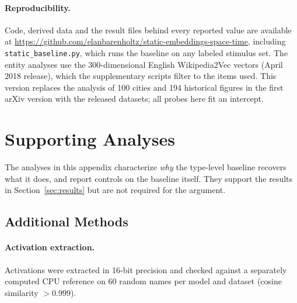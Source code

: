 \documentclass[11pt]{article}
\newif\ifanon
\begin{document}
\paragraph{Reproducibility.}
Code, derived data and the result files behind every reported value are available
\ifanon in the supplementary material\else at \url{https://github.com/elanbarenholtz/static-embeddings-space-time}\fi,
including \texttt{static\_baseline.py}, which runs the baseline
on any labeled stimulus set. The entity analyses use the 300-dimensional English Wikipedia2Vec vectors (April 2018 release), which the supplementary scripts filter to the items used.\ifanon\else{} This version replaces the analysis of 100 cities and 194 historical figures in the first arXiv version with the released datasets; all probes here fit an intercept.\fi




\appendix

\section{Supporting Analyses}
\label{sec:appendix}

The analyses in this appendix characterize \emph{why} the type-level baseline
recovers what it does, and report controls on the baseline itself. They support the
results in Section~\ref{sec:results} but are not required for the argument.

\subsection{Additional Methods}
\label{sec:extra_methods}

\paragraph{Activation extraction.} Activations were extracted in 16-bit precision and checked
against a separately computed CPU reference on 60 random names per model and dataset (cosine
similarity $> 0.999$).
\end{document}
